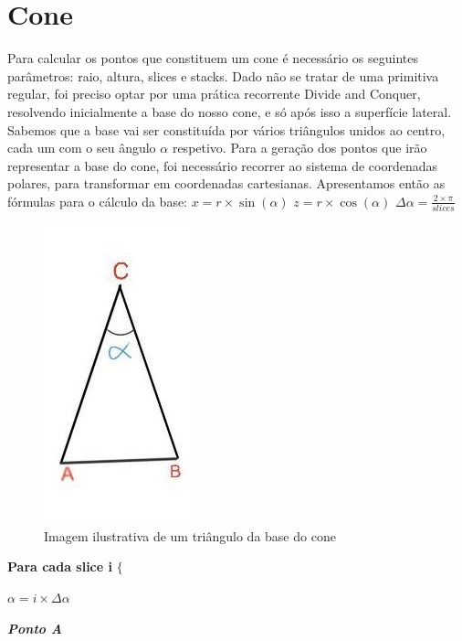 \documentclass[12pt]{article}
\begin{document}
\section{Cone}
Para calcular os pontos que constituem um cone é necessário os seguintes parâmetros: raio, altura, slices e stacks.
Dado não se tratar de uma primitiva regular, foi preciso optar por uma prática recorrente Divide and Conquer, 
resolvendo inicialmente a base do nosso cone, e só após isso a superfície lateral. Sabemos que a base vai ser constituída por vários triângulos
unidos ao centro, cada um com o seu ângulo $\alpha$ respetivo. Para a geração dos pontos que irão representar a base do cone, foi necessário recorrer ao 
sistema de coordenadas polares, para transformar em coordenadas cartesianas. Apresentamos então as fórmulas para o cálculo da base:\newline\newline
$x = r\times\sin(\alpha)$\newline\newline
$z=r\times\cos(\alpha)$\newline\newline
$\Delta\alpha = \frac{2\times\pi}{slices}$\newline
\begin{figure}[H]
\centering\includegraphics[scale=0.50]{triangulo} 
\caption{\label{fig:controller}Imagem ilustrativa de um triângulo da base do cone}
\end{figure}
\textbf{Para cada slice i} $\{$\newline
\par $\alpha = i \times \Delta\alpha$ \newline\newline
\par\textit{\textbf{Ponto A}} \newline
\end{document}
